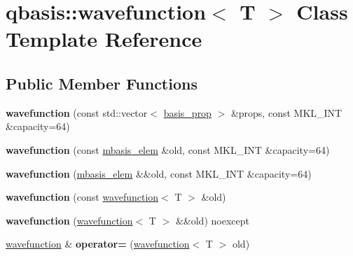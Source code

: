\hypertarget{classqbasis_1_1wavefunction}{}\section{qbasis\+:\+:wavefunction$<$ T $>$ Class Template Reference}
\label{classqbasis_1_1wavefunction}
\subsection*{Public Member Functions}
\begin{DoxyCompactItemize}
\item 
\mbox{\label{classqbasis_1_1wavefunction_a2a78f5cf7c7225c56839c2412d8ae896}} 
{\bfseries wavefunction} (const std\+::vector$<$ \hyperlink{classqbasis_1_1basis__prop}{basis\+\_\+prop} $>$ \&props, const M\+K\+L\+\_\+\+I\+NT \&capacity=64)
\item 
\mbox{\label{classqbasis_1_1wavefunction_a0113c1761f0f0d9a7843a6b0b0f9b280}} 
{\bfseries wavefunction} (const \hyperlink{classqbasis_1_1mbasis__elem}{mbasis\+\_\+elem} \&old, const M\+K\+L\+\_\+\+I\+NT \&capacity=64)
\item 
\mbox{\label{classqbasis_1_1wavefunction_a37a54810fba890f9fcc22a24c81cfe6a}} 
{\bfseries wavefunction} (\hyperlink{classqbasis_1_1mbasis__elem}{mbasis\+\_\+elem} \&\&old, const M\+K\+L\+\_\+\+I\+NT \&capacity=64)
\item 
\mbox{\label{classqbasis_1_1wavefunction_aabb6a42bb8f2c9e995ac1e4e691b5868}} 
{\bfseries wavefunction} (const \hyperlink{classqbasis_1_1wavefunction}{wavefunction}$<$ T $>$ \&old)
\item 
\mbox{\label{classqbasis_1_1wavefunction_a9f68a1fc1653f579f9894a283a5e1644}} 
{\bfseries wavefunction} (\hyperlink{classqbasis_1_1wavefunction}{wavefunction}$<$ T $>$ \&\&old) noexcept
\item 
\mbox{\label{classqbasis_1_1wavefunction_a38993f273f6a408ef755152083a87d9d}} 
\hyperlink{classqbasis_1_1wavefunction}{wavefunction} \& {\bfseries operator=} (\hyperlink{classqbasis_1_1wavefunction}{wavefunction}$<$ T $>$ old)

\end{DoxyCompactItemize}
